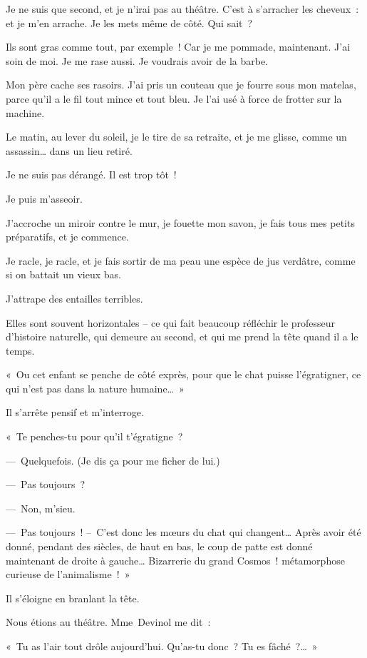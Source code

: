 \documentclass[french,twoside]{book} %
\begin{document}
Je ne suis que second, et je n’irai pas au théâtre. C’est à s’arracher les cheveux : et je m’en arrache. Je les mets même de côté. Qui sait ?\par
Ils sont gras comme tout, par exemple ! Car je me pommade, maintenant. J’ai soin de moi. Je me rase aussi. Je voudrais avoir de la barbe.\par
\bigbreak
\noindent Mon père cache ses rasoirs. J’ai pris un couteau que je fourre sous mon matelas, parce qu’il a le fil tout mince et tout bleu. Je l’ai usé à force de frotter sur la machine.\par
Le matin, au lever du soleil, je le tire de sa retraite, et je me glisse, comme un assassin… dans un lieu retiré.\par
Je ne suis pas dérangé. Il est trop tôt !\par
Je puis m’asseoir.\par
J’accroche un miroir contre le mur, je fouette mon savon, je fais tous mes petits préparatifs, et je commence.\par
Je racle, je racle, et je fais sortir de ma peau une espèce de jus verdâtre, comme si on battait un vieux bas.\par
\bigbreak
\noindent J’attrape des entailles terribles.\par
Elles sont souvent horizontales – ce qui fait beaucoup réfléchir le professeur d’histoire naturelle, qui demeure au second, et qui me prend la tête quand il a le temps.\par
« Ou cet enfant se penche de côté exprès, pour que le chat puisse l’égratigner, ce qui n’est pas dans la nature humaine… »\par
Il s’arrête pensif et m’interroge.\par
« Te penches-tu pour qu’il t’égratigne ?\par
— Quelquefois. (Je dis ça pour me ficher de lui.)\par
— Pas toujours ?\par
— Non, m’sieu.\par
— Pas toujours ! – C’est donc les mœurs du chat qui changent… Après avoir été donné, pendant des siècles, de haut en bas, le coup de patte est donné maintenant de droite à gauche… Bizarrerie du grand Cosmos ! métamorphose curieuse de l’animalisme ! »\par
Il s’éloigne en branlant la tête.\par
\bigbreak
\noindent Nous étions au théâtre. Mme Devinol me dit :\par
« Tu as l’air tout drôle aujourd’hui. Qu’as-tu donc ? Tu es fâché ?… »\par
\end{document}
